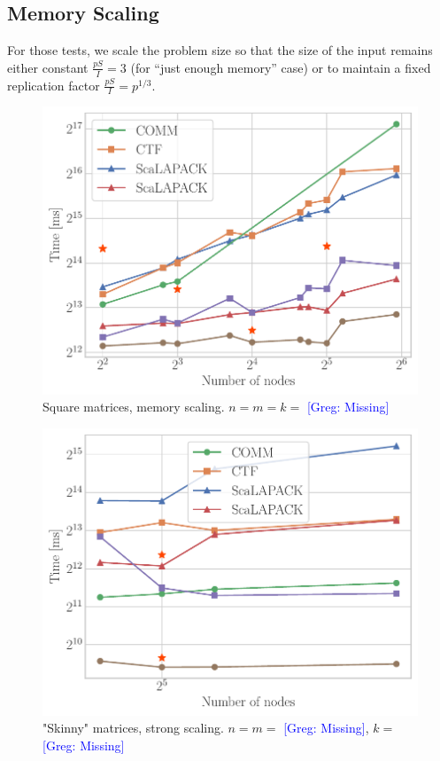\documentclass[sigplan,review,anonymous,10pt]{acmart}\settopmatter{printfolios=true,printccs=false,printacmref=false}
\newcommand\greg[1]{\textcolor{blue}{[Greg: #1]}}
\newcommand{\macb}[1]{\textbf{\textsf{#1}}}
\begin{document}
\subsection{Memory Scaling}
For those tests, we scale the problem size so that the size of the input 
remains either constant $\frac{pS}{I} = 3$ (for ``just enough memory'' case) or 
to maintain a fixed replication factor $\frac{pS}{I} = p^{1/3}$.

\begin{figure}
	\includegraphics[width=\columnwidth]{results/square_weak_scaling}
	\caption{Square matrices, memory scaling. $n=m=k=$ \greg{Missing}} 
	\label{fig:mmmParallelization}
\end{figure}

\begin{figure}
	\includegraphics[width=\columnwidth]{results/thin_weak_scaling}
	\caption{"Skinny" matrices, strong scaling. $n=m=$ \greg{Missing}, $k=$ 
	\greg{Missing}} 
	\label{fig:mmmParallelization}
\end{figure}
\end{document}
